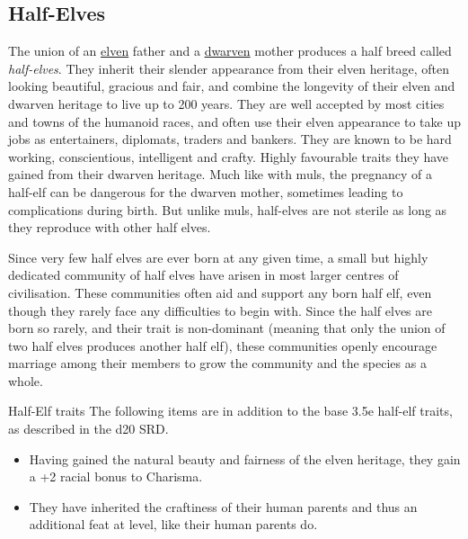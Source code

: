 \subsection{Half-Elves}
\label{sec:Half-Elves}

The union of an \hyperref[sec:Elves]{elven} father and a
\hyperref[sec:Dwarves]{dwarven} mother produces a half breed called
\emph{half-elves}. They inherit their slender appearance from their elven
heritage, often looking beautiful, gracious and fair, and combine the
longevity of their elven and dwarven heritage to live up to 200 years. They
are well accepted by most cities and towns of the humanoid races, and often
use their elven appearance to take up jobs as entertainers, diplomats, traders
and bankers. They are known to be hard working, conscientious, intelligent and
crafty. Highly favourable traits they have gained from their dwarven
heritage. Much like with muls, the pregnancy of a half-elf can be dangerous
for the dwarven mother, sometimes leading to complications during birth. But
unlike muls, half-elves are not sterile as long as they reproduce with other
half elves.

Since very few half elves are ever born at any given time, a small but highly
dedicated community of half elves have arisen in most larger centres of
civilisation. These communities often aid and support any born half elf, even
though they rarely face any difficulties to begin with. Since the half elves
are born so rarely, and their trait is non-dominant (meaning that only the
union of two half elves produces another half elf), these communities openly
encourage marriage among their members to grow the community and the species
as a whole.

\begin{35e}{Half-Elf traits}
  The following items are in addition to the base 3.5e half-elf traits, as
  described in the d20 SRD.
  \begin{itemize}[noitemsep]
  \item Having gained the natural beauty and fairness of the elven heritage,
    they gain a +2 racial bonus to Charisma.
  \item They have inherited the craftiness of their human parents and thus
    an additional feat at level, like their human parents do.
  \end{itemize}
\end{35e}
